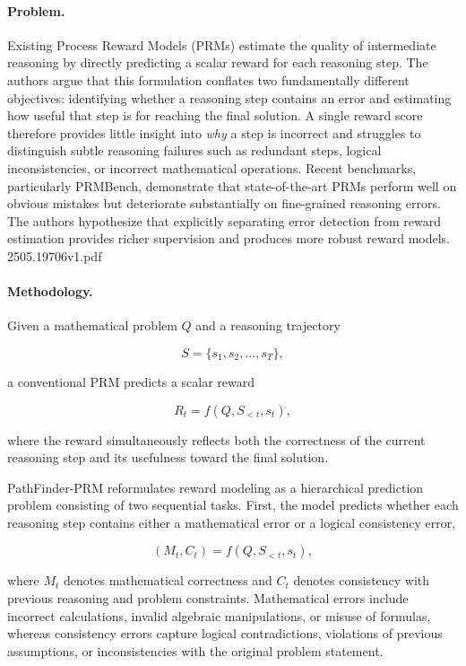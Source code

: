 \documentclass[11pt]{article}
\begin{document}
\paragraph{Problem.}
Existing Process Reward Models (PRMs) estimate the quality of intermediate reasoning by directly predicting a scalar reward for each reasoning step. The authors argue that this formulation conflates two fundamentally different objectives: identifying whether a reasoning step contains an error and estimating how useful that step is for reaching the final solution. A single reward score therefore provides little insight into \emph{why} a step is incorrect and struggles to distinguish subtle reasoning failures such as redundant steps, logical inconsistencies, or incorrect mathematical operations. Recent benchmarks, particularly PRMBench, demonstrate that state-of-the-art PRMs perform well on obvious mistakes but deteriorate substantially on fine-grained reasoning errors. The authors hypothesize that explicitly separating error detection from reward estimation provides richer supervision and produces more robust reward models. 2505.19706v1.pdf

\paragraph{Methodology.}
Given a mathematical problem \(Q\) and a reasoning trajectory

\[
S=\{s_1,s_2,\ldots,s_T\},
\]

a conventional PRM predicts a scalar reward

\[
R_t=f(Q,S_{<t},s_t),
\]

where the reward simultaneously reflects both the correctness of the current reasoning step and its usefulness toward the final solution.

PathFinder-PRM reformulates reward modeling as a hierarchical prediction problem consisting of two sequential tasks. First, the model predicts whether each reasoning step contains either a mathematical error or a logical consistency error,

\[
(M_t,C_t)
=
f(Q,S_{<t},s_t),
\]

where \(M_t\) denotes mathematical correctness and \(C_t\) denotes consistency with previous reasoning and problem constraints. Mathematical errors include incorrect calculations, invalid algebraic manipulations, or misuse of formulas, whereas consistency errors capture logical contradictions, violations of previous assumptions, or inconsistencies with the original problem statement.
\end{document}
